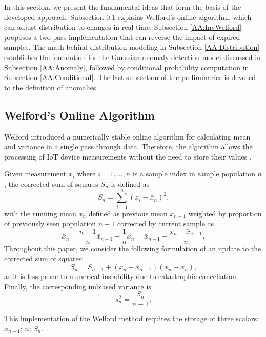 In this section, we present the fundamental ideas that form the basis of the developed approach. Subsection \ref{AA:Welford} explains Welford's online algorithm, which can adjust distribution to changes in real-time. Subsection \ref{AA:InvWelford} proposes a two-pass implementation that can reverse the impact of expired samples. The math behind distribution modeling in Subsection \ref{AA:Distribution} establishes the foundation for the Gaussian anomaly detection model discussed in Subsection \ref{AA:Anomaly}, followed by conditional probability computation in Subsection \ref{AA:Conditional}. The last subsection of the preliminaries is devoted to the definition of anomalies.

\subsection{Welford's Online Algorithm}\label{AA:Welford}
Welford introduced a numerically stable online algorithm for calculating mean and variance in a single pass through data. Therefore, the algorithm allows the processing of IoT device measurements without the need to store their values \cite{Wel62}.

Given measurement \(x_i\) where \(i=1,...,n\) is a sample index in sample population \(n\), the corrected sum of squares \(S_n\) is defined as
\begin{equation}
S_n = \sum_{i=1}^n (x_i - \bar x_n)^2\text{,}\label{eq:sumsquares}
\end{equation}
with the running mean \(\bar x_n\) defined as previous mean \(\bar x_{n-1}\) weighted by proportion of previously seen population \(n-1\) corrected by current sample as
\begin{equation}
\bar x_n = \frac{n-1}{n} \bar x_{n-1} + \frac{1}{n}x_n = \bar x_{n-1} + \frac{x_n - \bar x_{n-1}}{n}\text{.}\label{eq:runmean}
\end{equation}
Throughout this paper, we consider the following formulation of an update to the corrected sum of squares:
\begin{equation}
S_n = S_{n-1} + (x_n - \bar x_{n-1})(x_n - \bar x_n)\text{,}\label{eq:upsumsquares}
\end{equation}
as it is less prone to numerical instability due to catastrophic cancellation. Finally, the corresponding unbiased variance is
\begin{equation}
s^2_n = \frac{S_{n}}{n-1}\text{.}\label{eq:runvar}
\end{equation}

This implementation of the Welford method requires the storage of three scalars: \(\bar x_{n-1}\); \(n\); \(S_n\).

